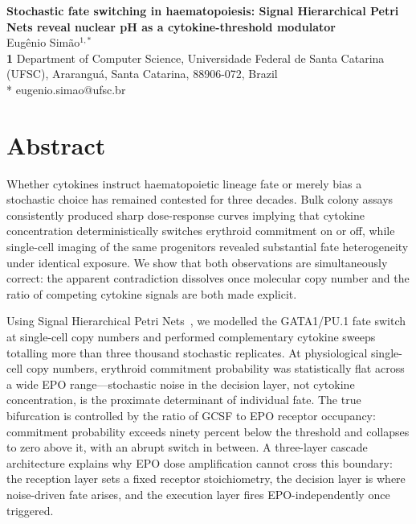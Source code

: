\documentclass[10pt,letterpaper]{article}
\begin{document}
\vspace*{0.2in}

\begin{flushleft}
{\Large
\textbf{Stochastic fate switching in haematopoiesis:
Signal Hierarchical Petri Nets reveal nuclear pH as a cytokine-threshold modulator}
}
\newline
\\
Eug\^enio Sim\~ao$^{1,*}$
\\
\bigskip
\textbf{1} Department of Computer Science, Universidade Federal de Santa Catarina
(UFSC), Ararangu\'a, Santa Catarina, 88906-072, Brazil \\
\bigskip
* eugenio.simao@ufsc.br
\end{flushleft}

\section*{Abstract}

Whether cytokines instruct haematopoietic lineage fate or merely bias a
stochastic choice has remained contested for three decades. Bulk colony assays
consistently produced sharp dose-response curves implying that cytokine
concentration deterministically switches erythroid commitment on or off, while
single-cell imaging of the same progenitors revealed substantial fate
heterogeneity under identical exposure. We show that both observations are
simultaneously correct: the apparent contradiction dissolves once molecular copy
number and the ratio of competing cytokine signals are both made explicit.

Using Signal Hierarchical Petri Nets~\cite{shypn2026}, we modelled the
GATA1/PU.1 fate switch at single-cell copy numbers and performed complementary
cytokine sweeps totalling more than three thousand stochastic replicates. At
physiological single-cell copy numbers, erythroid commitment probability was
statistically flat across a wide EPO range---stochastic noise in the decision
layer, not cytokine concentration, is the proximate determinant of individual
fate. The true bifurcation is controlled by the ratio of GCSF to EPO receptor
occupancy: commitment probability exceeds ninety percent below the threshold and
collapses to zero above it, with an abrupt switch in between. A three-layer
cascade architecture explains why EPO dose amplification cannot cross this
boundary: the reception layer sets a fixed receptor stoichiometry, the decision
layer is where noise-driven fate arises, and the execution layer fires
EPO-independently once triggered.
\end{document}
